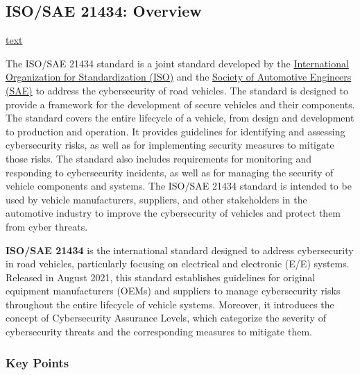 \subsection{ISO/SAE 21434: Overview}\label{subsec:iso-sae-21434}
\href{url}{text}

The ISO/SAE 21434 standard is a joint standard
developed by the \href{https://www.iso.org/home.html}{International Organization for Standardization (ISO)} and the
\href{https://www.sae.org/}{Society of Automotive Engineers (SAE)} to address the cybersecurity of road vehicles.
The standard is designed to provide a framework for the development of secure vehicles and their components.
The standard covers the entire lifecycle of a vehicle, from design and development to production and operation.
It provides guidelines for identifying and assessing cybersecurity risks, as well as for implementing security measures to mitigate those risks.
The standard also includes requirements for monitoring and responding to cybersecurity incidents, as well as for managing the security of vehicle components and systems.
The ISO/SAE 21434 standard is intended to be used by vehicle manufacturers,
suppliers, and other stakeholders in the automotive industry to improve the cybersecurity of vehicles and protect them from cyber threats\cite{iso-correlation}.

\textbf{ISO/SAE 21434} is the international standard designed to address cybersecurity in road vehicles, particularly focusing on electrical and electronic (E/E) systems.
Released in August 2021, this standard establishes guidelines for original equipment manufacturers (OEMs) and suppliers to manage cybersecurity risks throughout the entire lifecycle of vehicle systems.
Moreover, it introduces the concept of Cybersecurity Assurance Levels, which categorize the severity of cybersecurity threats and the corresponding measures to mitigate them\cite{moukahal2021towards}.
\subsubsection{Key Points}\label{subsubsec:key-points-1}

